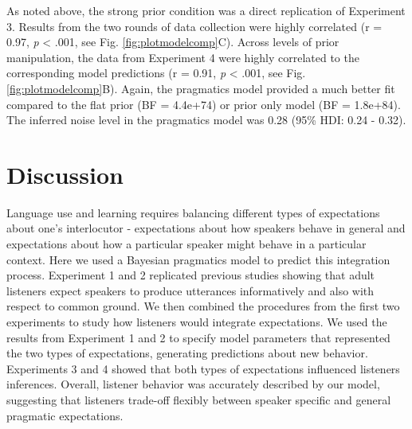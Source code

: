 \documentclass[10pt, letterpaper]{article}
\begin{document}
As noted above, the strong prior condition was a direct replication of
Experiment 3. Results from the two rounds of data collection were highly
correlated (r = 0.97, \emph{p} \textless{} .001, see Fig.
\ref{fig:plotmodelcomp}C). Across levels of prior manipulation, the data
from Experiment 4 were highly correlated to the corresponding model
predictions (r = 0.91, \emph{p} \textless{} .001, see Fig.
\ref{fig:plotmodelcomp}B). Again, the pragmatics model provided a much
better fit compared to the flat prior (BF = 4.4e+74) or prior only model
(BF = 1.8e+84). The inferred noise level in the pragmatics model was
0.28 (95\% HDI: 0.24 - 0.32).

\section{Discussion}\label{discussion}

Language use and learning requires balancing different types of
expectations about one's interlocutor - expectations about how speakers
behave in general and expectations about how a particular speaker might
behave in a particular context. Here we used a Bayesian pragmatics model
to predict this integration process. Experiment 1 and 2 replicated
previous studies showing that adult listeners expect speakers to produce
utterances informatively and also with respect to common ground. We then
combined the procedures from the first two experiments to study how
listeners would integrate expectations. We used the results from
Experiment 1 and 2 to specify model parameters that represented the two
types of expectations, generating predictions about new behavior.
Experiments 3 and 4 showed that both types of expectations influenced
listeners inferences. Overall, listener behavior was accurately
described by our model, suggesting that listeners trade-off flexibly
between speaker specific and general pragmatic expectations.
\end{document}
